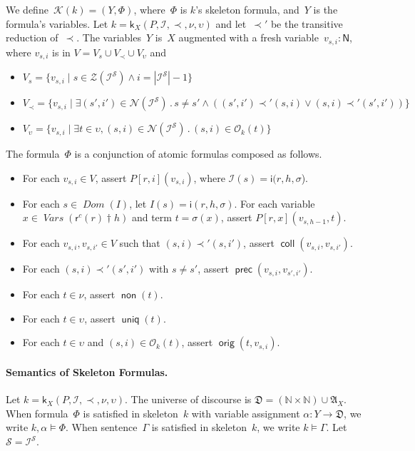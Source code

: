 \documentclass[12pt]{article}
\newcommand{\cn}[1]{\ensuremath{\operatorname{\mathsf{#1}}}}
\newcommand{\fn}[1]{\ensuremath{\operatorname{\mathit{#1}}}}
\newcommand{\srt}[1]{\ensuremath{\mathsf{#1}}}
\newcommand{\typ}{\mathbin:}
\newcommand{\sdom}{\fn{Dom}}
\newcommand{\vars}{\fn{Vars}}
\newcommand{\prefix}[2]{#1\dagger#2}
\newcommand{\nat}{\ensuremath{\mathbb{N}}}
\newcommand{\some}[1]{\exists#1\mathpunct.}
\newcommand{\alg}[1]{\ensuremath{\mathfrak{#1}}}
\newcommand{\msg}{\alg{A}}
\newcommand{\ssp}{\ensuremath{\mathcal{S}}}
\newcommand{\strands}{\ensuremath{\mathcal{Z}}}
\newcommand{\nodes}{\ensuremath{\mathcal{N}}}
\newcommand{\form}{\mathcal{K}}
\newcommand{\skel}{\mathsf{k}}
\newcommand{\insta}{\mathsf{i}}
\newcommand{\insts}{\mathcal{I}}
\newcommand{\role}{\mathsf{r}}
\newcommand{\orig}{\mathcal{O}}
\begin{document}
We define~$\form(k)=(Y,\Phi)$, where~$\Phi$ is $k$'s skeleton formula,
and~$Y$ is the formula's variables.  Let
$k=\skel_X(P,\insts,\prec,\nu,\upsilon)$ and let~$\prec'$ be the
transitive reduction of~$\prec$.  The variables~$Y$ is~$X$ augmented
with a fresh variable~$v_{s,i}\typ\srt{N}$, where $v_{s,i}$ is in
$V=V_s\cup V_\prec\cup V_\upsilon$ and
\begin{itemize}
\item $V_s=\{v_{s,i}\mid s\in\strands(\insts^\ssp)\land
  i=|\insts^\ssp|-1\}$
\item $V_\prec=\{v_{s,i}\mid
  \some{(s',i')\in\nodes(\insts^\ssp)}s\neq s'\land((s',i')\prec'(s,i)\lor(s,i)\prec' (s',i'))\}$
\item $V_\upsilon=\{v_{s,i}\mid\some{t\in\upsilon,(s,i)\in
  \nodes(\insts^\ssp)}(s,i)\in\orig_k(t)\}$
\end{itemize}

The formula~$\Phi$ is a conjunction of atomic formulas composed as
follows.
\begin{itemize}
\item For each $v_{s,i}\in V$, assert $P[r,i](v_{s,i})$,
  where $\insts(s)=\insta(r,h,\sigma$).
\item For each $s\in\sdom(I)$, let $I(s)=\insta(r,h,\sigma)$.  For
  each variable
  $x\in\vars(\prefix{\role^c(r)}{h})$ and term $t=\sigma(x)$, assert
  $P[r,x](v_{s,h-1},t)$.
\item For each $v_{s,i},v_{s,i'}\in V$ such that $(s,i)\prec'(s,i')$, assert
  $\cn{coll}(v_{s,i},v_{s,i'})$.
\item For each $(s,i)\prec'(s',i')$ with $s\neq s'$, assert
  $\cn{prec}(v_{s,i},v_{s',i'})$.
\item For each $t\in\nu$, assert $\cn{non}(t)$.
\item For each $t\in\upsilon$, assert $\cn{uniq}(t)$.
\item For each $t\in\upsilon$ and $(s,i)\in\orig_k(t)$, assert
  $\cn{orig}(t,v_{s, i})$.
\end{itemize}

\paragraph{Semantics of Skeleton Formulas.}

Let $k=\skel_X(P,\insts,\prec,\nu,\upsilon)$.  The universe of discourse is
$\alg{D}=(\nat\times\nat)\cup\msg_X$.  When formula~$\Phi$ is satisfied in
skeleton~$k$ with variable assignment $\alpha\colon Y\to \alg{D}$, we
write $k,\alpha\models\Phi$.  When sentence~$\Gamma$ is satisfied in
skeleton~$k$, we write $k\models\Gamma$.  Let $\ssp=\insts^\ssp$.
\end{document}
